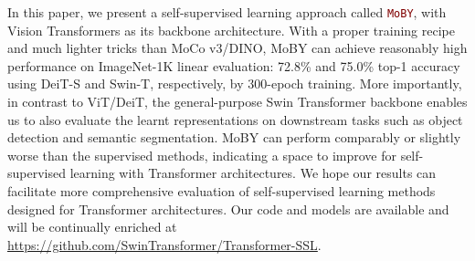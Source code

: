 \documentclass{article}
\begin{document}
In this paper, we present a self-supervised learning approach called \textcolor{Maroon}{\texttt{MoBY}}, with Vision Transformers as its backbone architecture. With a proper training recipe and much lighter tricks than MoCo v3/DINO, MoBY can achieve reasonably high performance on ImageNet-1K linear evaluation: 72.8\% and 75.0\% top-1 accuracy using DeiT-S and Swin-T, respectively, by 300-epoch training. More importantly, in contrast to ViT/DeiT, the general-purpose Swin Transformer backbone enables us to also evaluate the learnt representations on downstream tasks such as object detection and semantic segmentation. MoBY can perform comparably or slightly worse than the supervised methods, indicating a space to improve for self-supervised learning with Transformer architectures. We hope our results can facilitate more comprehensive evaluation of self-supervised learning methods designed for Transformer architectures. Our code and models are available and will be continually enriched at \url{https://github.com/SwinTransformer/Transformer-SSL}.

\newpage



\end{document}
